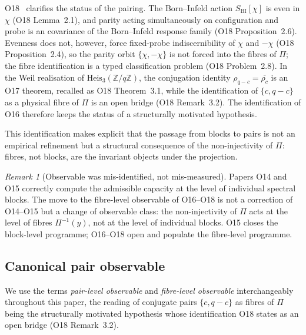 \documentclass[11pt,a4paper]{article}
\theoremstyle{definition}
\theoremstyle{remark}
\newtheorem{remark}[theorem]{Remark}
\begin{document}
      O18~\cite{Beau2026a22} clarifies the status of the pairing.
      The Born--Infeld action $S_{\mathrm{BI}}[\chi]$ is even in
      $\chi$ (O18 Lemma~2.1), and parity acting simultaneously on
      configuration and probe is an covariance of the Born--Infeld
      response family (O18 Proposition~2.6).
      Evenness does not, however, force fixed-probe indiscernibility of
      $\chi$ and $-\chi$ (O18 Proposition~2.4), so the parity orbit
      $\{\chi, -\chi\}$ is not forced into the fibres of $\Pi$;
      the fibre identification is a typed classification problem
      (O18 Problem~2.8).
      In the Weil realisation of
      $\mathrm{Heis}_3(\mathbb{Z}/q\mathbb{Z})$, the conjugation identity
      $\rho_{q-c} = \overline{\rho_c}$ is an O17 theorem, recalled as O18
      Theorem~3.1, while the identification of $\{c, q-c\}$ as a physical
      fibre of $\Pi$ is an open bridge (O18 Remark~3.2).
      The identification of O16 therefore keeps the status of a
      structurally motivated hypothesis.

      This identification makes explicit that the passage from blocks to
      pairs is not an empirical refinement but a structural consequence
      of the non-injectivity of $\Pi$: fibres, not blocks, are the
      invariant objects under the projection.

      \begin{remark}[Observable was mis-identified, not mis-measured]
        \label{rem:mis-identified}
        Papers O14 and O15 correctly compute the admissible capacity at the
        level of individual spectral blocks.
        The move to the fibre-level observable of O16--O18 is not a
        correction of O14--O15 but a change of observable class: the
        non-injectivity of $\Pi$ acts at the level of fibres $\Pi^{-1}(y)$,
        not at the level of individual blocks.
        O15 closes the block-level programme; O16--O18 open and populate the
        fibre-level programme.
      \end{remark}

    \subsection{Canonical pair observable}
      \label{sec:canonical-obs}

      We use the terms \emph{pair-level observable} and
      \emph{fibre-level observable} interchangeably throughout this paper,
      the reading of conjugate pairs $\{c, q-c\}$ as fibres of $\Pi$ being
      the structurally motivated hypothesis whose identification O18 states
      as an open bridge (O18 Remark~3.2).
\end{document}
